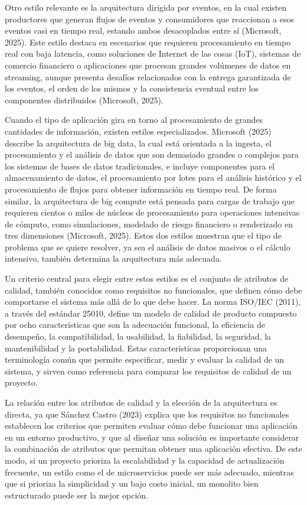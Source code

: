 \documentclass[12pt,letterpaper]{article}
\begin{document}
Otro estilo relevante es la arquitectura dirigida por eventos, en la cual existen productores que generan flujos de eventos y consumidores que reaccionan a esos eventos casi en tiempo real, estando ambos desacoplados entre sí (Microsoft, 2025). Este estilo destaca en escenarios que requieren procesamiento en tiempo real con baja latencia, como soluciones de Internet de las cosas (IoT), sistemas de comercio financiero o aplicaciones que procesan grandes volúmenes de datos en streaming, aunque presenta desafíos relacionados con la entrega garantizada de los eventos, el orden de los mismos y la consistencia eventual entre los componentes distribuidos (Microsoft, 2025).
 
Cuando el tipo de aplicación gira en torno al procesamiento de grandes cantidades de información, existen estilos especializados. Microsoft (2025) describe la arquitectura de big data, la cual está orientada a la ingesta, el procesamiento y el análisis de datos que son demasiado grandes o complejos para los sistemas de bases de datos tradicionales, e incluye componentes para el almacenamiento de datos, el procesamiento por lotes para el análisis histórico y el procesamiento de flujos para obtener información en tiempo real. De forma similar, la arquitectura de big compute está pensada para cargas de trabajo que requieren cientos o miles de núcleos de procesamiento para operaciones intensivas de cómputo, como simulaciones, modelado de riesgo financiero o renderizado en tres dimensiones (Microsoft, 2025). Estos dos estilos muestran que el tipo de problema que se quiere resolver, ya sea el análisis de datos masivos o el cálculo intensivo, también determina la arquitectura más adecuada.
 
Un criterio central para elegir entre estos estilos es el conjunto de atributos de calidad, también conocidos como requisitos no funcionales, que definen cómo debe comportarse el sistema más allá de lo que debe hacer. La norma ISO/IEC (2011), a través del estándar 25010, define un modelo de calidad de producto compuesto por ocho características que son la adecuación funcional, la eficiencia de desempeño, la compatibilidad, la usabilidad, la fiabilidad, la seguridad, la mantenibilidad y la portabilidad. Estas características proporcionan una terminología común que permite especificar, medir y evaluar la calidad de un sistema, y sirven como referencia para comparar los requisitos de calidad de un proyecto.
 
La relación entre los atributos de calidad y la elección de la arquitectura es directa, ya que Sánchez Castro (2023) explica que los requisitos no funcionales establecen los criterios que permiten evaluar cómo debe funcionar una aplicación en un entorno productivo, y que al diseñar una solución es importante considerar la combinación de atributos que permitan obtener una aplicación efectiva. De este modo, si un proyecto prioriza la escalabilidad y la capacidad de actualización frecuente, un estilo como el de microservicios puede ser más adecuado, mientras que si prioriza la simplicidad y un bajo costo inicial, un monolito bien estructurado puede ser la mejor opción.
 
\end{document}

